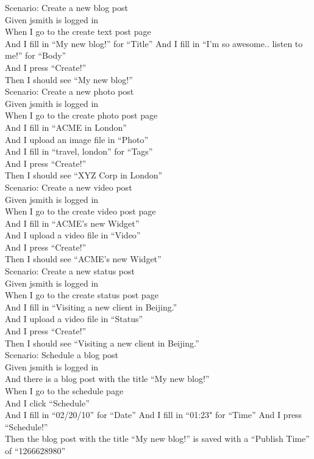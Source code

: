 \documentclass[12pt]{article}
\begin{document}
Scenario: Create a new blog post \\
  Given jsmith is logged in \\
  When I go to the create text post page \\
  And I fill in ``My new blog!'' for ``Title''
  And I fill in ``I'm so awesome.. listen to me!'' for ``Body'' \\
  And I press ``Create!'' \\
  Then I should see ``My new blog!'' \\
  
Scenario: Create a new photo post \\
  Given jsmith is logged in \\
  When I go to the create photo post page \\
  And I fill in ``ACME in London'' \\
  And I upload an image file in ``Photo'' \\
  And I fill in ``travel, london'' for ``Tags'' \\
  And I press ``Create!'' \\
  Then I should see ``XYZ Corp in London'' \\
  
  Scenario: Create a new video post \\
    Given jsmith is logged in \\
    When I go to the create video post page \\
    And I fill in ``ACME's new Widget'' \\
    And I upload a video file in ``Video'' \\
    And I press ``Create!'' \\
    Then I should see ``ACME's new Widget'' \\
  
  Scenario: Create a new status post \\
    Given jsmith is logged in \\
    When I go to the create status post page \\
    And I fill in ``Visiting a new client in Beijing.'' \\
    And I upload a video file in ``Status'' \\
    And I press ``Create!'' \\
    Then I should see ``Visiting a new client in Beijing.'' \\

  Scenario: Schedule a blog post \\
    Given jsmith is logged in \\
    And there is a blog post with the title ``My new blog!'' \\
    When I go to the schedule page \\
    And I click ``Schedule'' \\
    And I fill in ``02/20/10'' for ``Date''
    And I fill in ``01:23" for ``Time''
    And I press ``Schedule!'' \\
    Then the blog post with the title ``My new blog!'' is saved with a ``Publish Time'' of ``1266628980'' \\
\end{document}
